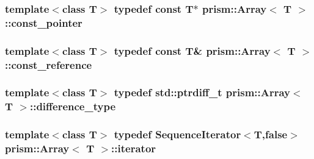 \subsubsection[{\texorpdfstring{const\+\_\+pointer}{const_pointer}}]{\setlength{\rightskip}{0pt plus 5cm}template$<$class T$>$ typedef const T$\ast$ {\bf prism\+::\+Array}$<$ T $>$\+::{\bf const\+\_\+pointer}}\hypertarget{classprism_1_1_array_a555c4123ec8e113e5ff25e0e5a3525d0}{}\label{classprism_1_1_array_a555c4123ec8e113e5ff25e0e5a3525d0}
\subsubsection[{\texorpdfstring{const\+\_\+reference}{const_reference}}]{\setlength{\rightskip}{0pt plus 5cm}template$<$class T$>$ typedef const T\& {\bf prism\+::\+Array}$<$ T $>$\+::{\bf const\+\_\+reference}}\hypertarget{classprism_1_1_array_a7736e6455cfc2e330981405251756394}{}\label{classprism_1_1_array_a7736e6455cfc2e330981405251756394}
\subsubsection[{\texorpdfstring{difference\+\_\+type}{difference_type}}]{\setlength{\rightskip}{0pt plus 5cm}template$<$class T$>$ typedef std\+::ptrdiff\+\_\+t {\bf prism\+::\+Array}$<$ T $>$\+::{\bf difference\+\_\+type}}\hypertarget{classprism_1_1_array_abae2669a2cdeba360b37d2f872af9208}{}\label{classprism_1_1_array_abae2669a2cdeba360b37d2f872af9208}
\subsubsection[{\texorpdfstring{iterator}{iterator}}]{\setlength{\rightskip}{0pt plus 5cm}template$<$class T$>$ typedef {\bf Sequence\+Iterator}$<$T,false$>$ {\bf prism\+::\+Array}$<$ T $>$\+::{\bf iterator}}\hypertarget{classprism_1_1_array_acf99b1f921727cf61cf9d5b66acc66b8}{}\label{classprism_1_1_array_acf99b1f921727cf61cf9d5b66acc66b8}
